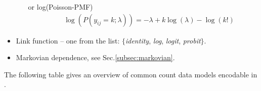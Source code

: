 \begin{itemize}
\begin{itemize}
or log(Poisson-PMF) 
\begin{eqnarray}
&&	\log(P(y_{ij}=k;\lambda)) = -\lambda + k \log(\lambda) - \log(k!) \nonumber
\end{eqnarray}
\end{itemize}
\item
Link function -- one from the list: $\{$\emph{identity}, \emph{log}, \emph{logit}, \emph{probit}$\}$. 
\item
Markovian dependence, see Sec.\ref{subsec:markovian}.
\end{itemize}


The following table gives an overview of common count data models encodable 
in \pharmml.

